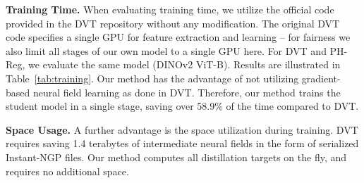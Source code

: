 \documentclass{article}
\begin{document}
\renewcommand{\arraystretch}{1.2}
\begin{table}[t]
\centering
\caption{\textbf{Training Time Efficiency Analysis.} We report the training time of our PH-Reg method compared to DVT. For fairness, we restrict all stages of our model to a single GPU and evaluate the same model (DINOv2 ViT-B).}
\vspace{.1cm}
\label{tab:training}
\vspace{-.2cm}
\end{table} \textbf{Training Time.} When evaluating training time, we utilize the official code provided in the DVT repository without any modification. The original DVT code specifies a single GPU for feature extraction and learning – for fairness we also limit all stages of our own model to a single GPU here. For DVT and PH-Reg, we evaluate the same model (DINOv2 ViT-B).
Results are illustrated in Table~\ref{tab:training}. Our method has the advantage of not utilizing gradient-based neural field learning as done in DVT. Therefore, our method trains the student model in a single stage, saving over 58.9\% of the time compared to DVT.


\textbf{Space Usage.} A further advantage is the space utilization during training. DVT requires saving 1.4 terabytes of intermediate neural fields in the form of serialized Instant-NGP files. Our method computes all distillation targets on the fly, and requires no additional space.
\end{document}
